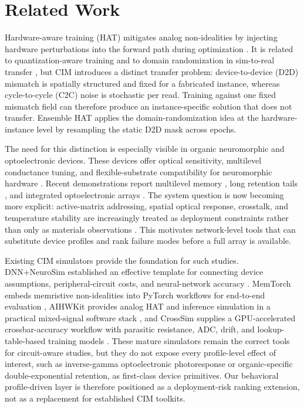 \section{Related Work}
\label{sec:related-work}

Hardware-aware training (HAT) mitigates analog non-idealities by injecting hardware perturbations into the forward path during optimization \citep{joshi2020accurate}. It is related to quantization-aware training \citep{choi2019pact} and to domain randomization in sim-to-real transfer \citep{tobin2017domain}, but CIM introduces a distinct transfer problem: device-to-device (D2D) mismatch is spatially structured and fixed for a fabricated instance, whereas cycle-to-cycle (C2C) noise is stochastic per read. Training against one fixed mismatch field can therefore produce an instance-specific solution that does not transfer. Ensemble HAT applies the domain-randomization idea at the hardware-instance level by resampling the static D2D mask across epochs.

The need for this distinction is especially visible in organic neuromorphic and optoelectronic devices. These devices offer optical sensitivity, multilevel conductance tuning, and flexible-substrate compatibility for neuromorphic hardware \citep{xu2025emerging,photonics2025organicreview,beller2024organicneurons,ji2025singleoectneuron}. Recent demonstrations report multilevel memory \citep{guo2024organic,jung2024organicfilaments}, long retention tails \citep{zeng2023organicmemristor}, and integrated optoelectronic arrays \citep{gebregiorgis2023organiccim,liu2026opect,zhang2025mooptoelectronic,cui2025multimode}. The system question is now becoming more explicit: active-matrix addressing, spatial optical response, crosstalk, and temperature stability are increasingly treated as deployment constraints rather than only as materials observations \citep{visionarch2023crosstalk,amspa2024insensor,jang2023insensor,fuller2020tempresilient,guo2024hightemp}. This motivates network-level tools that can substitute device profiles and rank failure modes before a full array is available.

Existing CIM simulators provide the foundation for such studies. DNN+NeuroSim established an effective template for connecting device assumptions, peripheral-circuit costs, and neural-network accuracy \citep{peng2020dnnneurosim}. MemTorch embeds memristive non-idealities into PyTorch workflows for end-to-end evaluation \citep{lammie2022memtorch}, AIHWKit provides analog HAT and inference simulation in a practical mixed-signal software stack \citep{rasch2021aihwkit}, and CrossSim supplies a GPU-accelerated crossbar-accuracy workflow with parasitic resistance, ADC, drift, and lookup-table-based training models \citep{crosssim2024}. These mature simulators remain the correct tools for circuit-aware studies, but they do not expose every profile-level effect of interest, such as inverse-gamma optoelectronic photoresponse or organic-specific double-exponential retention, as first-class device primitives. Our behavioral profile-driven layer is therefore positioned as a deployment-risk ranking extension, not as a replacement for established CIM toolkits.
